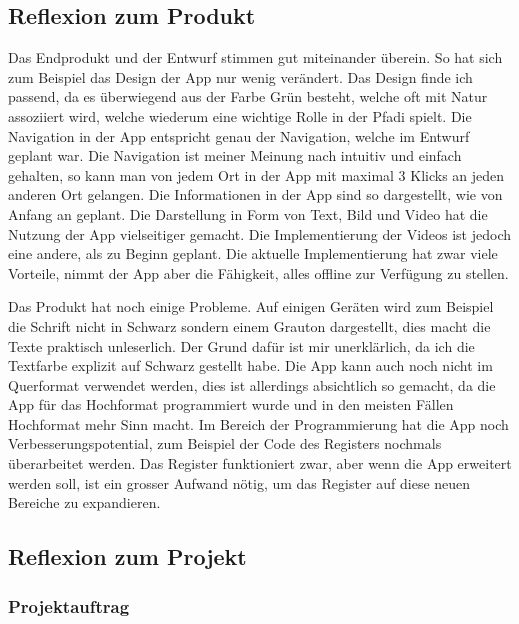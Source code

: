 \subsection{Reflexion zum Produkt}

Das Endprodukt und der Entwurf stimmen gut miteinander überein. So hat sich zum Beispiel das Design der App nur wenig verändert. Das Design finde ich passend, da es überwiegend aus der Farbe Grün besteht, welche oft mit Natur assoziiert wird, welche wiederum eine wichtige Rolle in der Pfadi spielt. Die Navigation in der App entspricht genau der Navigation, welche im Entwurf geplant war. Die Navigation ist meiner Meinung nach intuitiv und einfach gehalten, so kann man von jedem Ort in der App mit maximal 3 Klicks an jeden anderen Ort gelangen. Die Informationen in der App sind so dargestellt, wie von Anfang an geplant. Die Darstellung in Form von Text, Bild und Video hat die Nutzung der App vielseitiger gemacht. Die Implementierung der Videos ist jedoch eine andere, als zu Beginn geplant. Die aktuelle Implementierung hat zwar viele Vorteile, nimmt der App aber die Fähigkeit, alles offline zur Verfügung zu stellen. \par
Das Produkt hat noch einige Probleme. Auf einigen Geräten wird zum Beispiel die Schrift nicht in Schwarz sondern einem Grauton dargestellt, dies macht die Texte praktisch unleserlich. Der Grund dafür ist mir unerklärlich, da ich die Textfarbe explizit auf Schwarz gestellt habe. Die App kann auch noch nicht im Querformat verwendet werden, dies ist allerdings absichtlich so gemacht, da die App für das Hochformat programmiert wurde und in den meisten Fällen Hochformat mehr Sinn macht. Im Bereich der Programmierung hat die App noch Verbesserungspotential, zum Beispiel der Code des Registers nochmals überarbeitet werden. Das Register funktioniert zwar, aber wenn die App erweitert werden soll, ist ein grosser Aufwand nötig, um das Register auf diese neuen Bereiche zu expandieren. 

\subsection{Reflexion zum Projekt}

\subsubsection{Projektauftrag}

